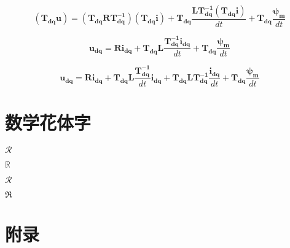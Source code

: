 \documentclass{MyTemplate}
\begin{document}
\begin{equation}
	(\bm{T_{dq}} \bm{u}) =(\bm{T_{dq}} \bm{R} \bm{T_{dq}^{-1}})
	(\bm{T_{dq}}  \bm{i}) + \bm{T_{dq}} 
	\frac{\bm{L} \bm{T_{dq}^{-1}} (\bm{T_{dq}}\bm{i})}{dt} + 
	\bm{T_{dq}} \frac{\bm{\psi_m}}{dt} 
\end{equation}


\begin{equation}
	\bm{u_{dq}} =\bm{R}\bm{i_{dq}} + \bm{T_{dq}} \bm{L}
	\frac{\bm{T_{dq}^{-1}} \bm{i_{dq}}}{dt} + 
	\bm{T_{dq}} \frac{\bm{\psi_m}}{dt} 
\end{equation}


\begin{equation}
	\bm{u_{dq}} =\bm{R}\bm{i_{dq}} + 
	\bm{T_{dq}}\bm{L}\frac{\bm{T_{dq}^{-1}}}{dt} \bm{i_{dq}} + 
	\bm{T_{dq}} \bm{L} \bm{T_{dq}^{-1}} \frac{\bm{i_{dq}}}{dt} + 
	\bm{T_{dq}} \frac{\bm{\psi_m}}{dt} 
\end{equation}



\section{数学花体字}
$\mathcal{R}$

$\mathbb{R}$

$\mathscr{R}$

$\mathfrak{R}$


\newpage


\appendix

\section{附录}
\end{document}
